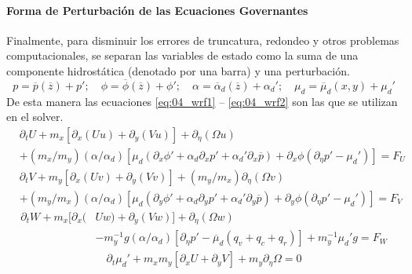 \paragraph{Forma de Perturbación de las Ecuaciones Governantes} Finalmente, para disminuir los errores de truncatura, redondeo y otros problemas computacionales, se separan las variables de estado como la suma de una componente hidrostática (denotado por una barra) y una perturbación.
\begin{equation*}
p=\overline{p}(\overline{z}) + p';\quad \phi=\overline{\phi}(\overline{z}) + \phi';\quad \alpha=\overline{\alpha}_d(\overline{z}) + \alpha_d';\quad \mu_d=\overline{\mu}_d(x,y) + \mu_d'
\end{equation*}
De esta manera las ecuaciones \ref{eq:04_wrf1} -- \ref{eq:04_wrf2} son las que se utilizan en el solver.
\begin{equation}\begin{split}\label{eq:04_wrf1}
&\partial_t U + m_x[\partial_x(Uu)+\partial_y(Vu)]+\partial_\eta(\Omega u) \\
&+ (m_x/m_y)(\alpha/\alpha_d)[\mu_d(\partial_x\phi' + \alpha_d \partial_x p' + \alpha_d'\partial_x \overline p)+\partial_x\phi(\partial_\eta p' - \mu_d')] = F_U
\end{split}\end{equation}
\begin{equation}\begin{split}
&\partial_t V + m_y[\partial_x(Uv)+\partial_y(Vv)]+(m_y/m_x)\partial_\eta(\Omega v) \\
&+ (m_y/m_x)(\alpha/\alpha_d)[\mu_d(\partial_y\phi' + \alpha_d \partial_y p' + \alpha_d'\partial_y \overline p)+\partial_y\phi(\partial_\eta p' - \mu_d')] = F_V
\end{split}\end{equation}
\begin{equation}\begin{split}
\partial_t W + m_x[\partial_x(&Uw)+\partial_y(Vw)]+\partial_\eta(\Omega w) \\
\hspace{1cm}&- m_y^{-1}g(\alpha/\alpha_d)[\partial_\eta p' - \overline{\mu}_d(q_v+q_c+q_r)]+m_y^{-1}\mu_d' g = F_W
\end{split}\end{equation}
\begin{equation}\begin{split}
\partial_t \mu_d' + m_x m_y[\partial_x U + \partial_y V] + m_y\partial_\eta \Omega = 0
\end{split}\end{equation}
